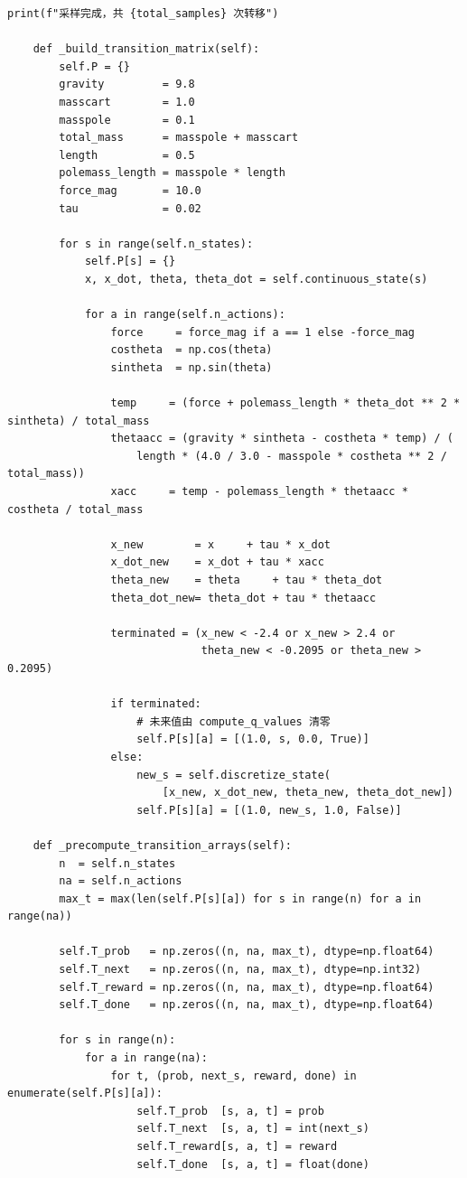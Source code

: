 \documentclass[12pt,a4paper]{article}
\begin{document}
\begin{lstlisting}[caption={策略迭代与值迭代算法完整实现（3.py）}]
        print(f"采样完成，共 {total_samples} 次转移")

    def _build_transition_matrix(self):
        self.P = {}
        gravity         = 9.8
        masscart        = 1.0
        masspole        = 0.1
        total_mass      = masspole + masscart
        length          = 0.5
        polemass_length = masspole * length
        force_mag       = 10.0
        tau             = 0.02

        for s in range(self.n_states):
            self.P[s] = {}
            x, x_dot, theta, theta_dot = self.continuous_state(s)

            for a in range(self.n_actions):
                force     = force_mag if a == 1 else -force_mag
                costheta  = np.cos(theta)
                sintheta  = np.sin(theta)

                temp     = (force + polemass_length * theta_dot ** 2 * sintheta) / total_mass
                thetaacc = (gravity * sintheta - costheta * temp) / (
                    length * (4.0 / 3.0 - masspole * costheta ** 2 / total_mass))
                xacc     = temp - polemass_length * thetaacc * costheta / total_mass

                x_new        = x     + tau * x_dot
                x_dot_new    = x_dot + tau * xacc
                theta_new    = theta     + tau * theta_dot
                theta_dot_new= theta_dot + tau * thetaacc

                terminated = (x_new < -2.4 or x_new > 2.4 or
                              theta_new < -0.2095 or theta_new > 0.2095)

                if terminated:
                    # 未来值由 compute_q_values 清零
                    self.P[s][a] = [(1.0, s, 0.0, True)]
                else:
                    new_s = self.discretize_state(
                        [x_new, x_dot_new, theta_new, theta_dot_new])
                    self.P[s][a] = [(1.0, new_s, 1.0, False)]

    def _precompute_transition_arrays(self):
        n  = self.n_states
        na = self.n_actions
        max_t = max(len(self.P[s][a]) for s in range(n) for a in range(na))

        self.T_prob   = np.zeros((n, na, max_t), dtype=np.float64)
        self.T_next   = np.zeros((n, na, max_t), dtype=np.int32)
        self.T_reward = np.zeros((n, na, max_t), dtype=np.float64)
        self.T_done   = np.zeros((n, na, max_t), dtype=np.float64)

        for s in range(n):
            for a in range(na):
                for t, (prob, next_s, reward, done) in enumerate(self.P[s][a]):
                    self.T_prob  [s, a, t] = prob
                    self.T_next  [s, a, t] = int(next_s)
                    self.T_reward[s, a, t] = reward
                    self.T_done  [s, a, t] = float(done)


\end{lstlisting}
\end{document}

